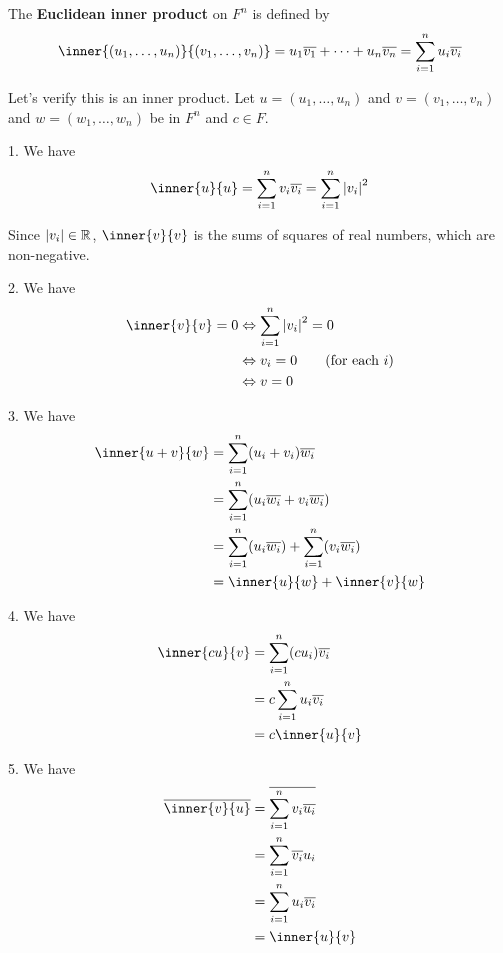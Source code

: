 \documentclass{article}
\begin{document}
    \begin{example}
      The \textbf{Euclidean inner product} on $F^n$ is defined by \[
        \inner{(u_1, \ldots, u_n)}{(v_1, \ldots, v_n)} = u_1\overline{v_1} + \dots + u_n\overline{v_n} = \sum_{i=1}^n u_i\overline{v_i}
      \]

      Let's verify this is an inner product. Let $u = (u_1, \ldots, u_n)$ and $v = (v_1, \ldots, v_n)$ and $w = (w_1, \ldots, w_n)$ be in $F^n$ and $c \in F$.

      1. We have \[
        \inner{u}{u} = \sum_{i=1}^n v_i\overline{v_i} = \sum_{i=1}^n \abs{v_i}^2
      \]

      Since $\abs{v_i} \in \mathbb{R}$, $\inner{v}{v}$ is the sums of squares of real numbers, which are non-negative.

      2. We have
      \begin{align*}
        \inner{v}{v} = 0 &\iff \sum_{i=1}^n \abs{v_i}^2 = 0\\
        &\iff v_i = 0 \tag{for each $i$}\\
        &\iff v = 0
      \end{align*}

      3. We have
      \begin{align*}
        \inner{u+v}{w} &= \sum_{i=1}^n (u_i + v_i)\overline{w_i}\\
        &= \sum_{i=1}^n (u_i\overline{w_i} + v_i\overline{w_i})\\
        &= \sum_{i=1}^n (u_i\overline{w_i}) + \sum_{i=1}^n (v_i\overline{w_i})\\
        &= \inner{u}{w} + \inner{v}{w}\\
      \end{align*}

      4. We have
      \begin{align*}
        \inner{cu}{v} &= \sum_{i=1}^n (cu_i)\overline{v_i}\\
        &= c\sum_{i=1}^n u_i\overline{v_i}\\
        &= c\inner{u}{v}
      \end{align*}

      5. We have
      \begin{align*}
        \overline{\inner{v}{u}} &= \overline{\sum_{i=1}^n v_i\overline{u_i}}\\
        &= \sum_{i=1}^n \overline{v_i}u_i\\
        &= \sum_{i=1}^n u_i\overline{v_i}\\
        &= \inner{u}{v}
      \end{align*}
    \end{example}
\end{document}
